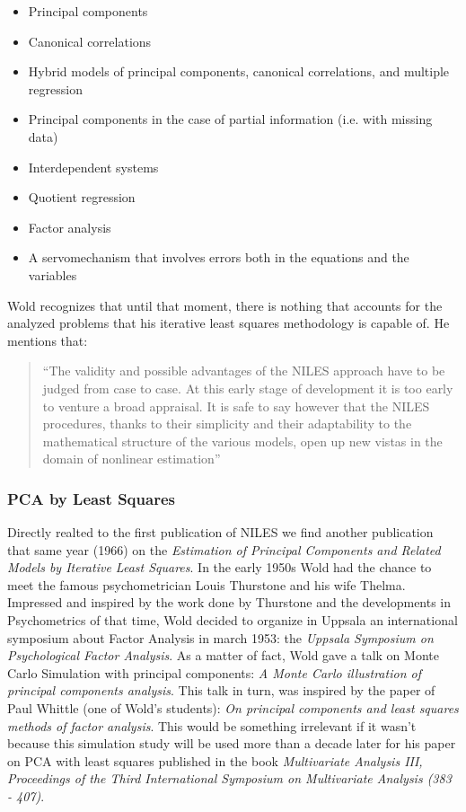 \documentclass[12pt]{book}\usepackage{graphicx, color}
\begin{document}
\begin{itemize}
 \item Principal components 
 \item Canonical correlations
 \item Hybrid models of principal components, canonical correlations, and multiple regression
 \item Principal components in the case of partial information (i.e. with missing data)
 \item Interdependent systems
 \item Quotient regression
 \item Factor analysis
 \item A servomechanism that involves errors both in the equations and the variables
\end{itemize}

\vspace{2mm}
Wold recognizes that until that moment, there is nothing that accounts for the analyzed problems that his iterative least squares methodology is capable of. He mentions that: 

\begin{quotation}\noindent
``The validity and possible advantages of the NILES approach have to be judged from case to case. At this early stage of development it is too early to venture a broad appraisal. It is safe to say however that the NILES procedures, thanks to their simplicity and their adaptability to the mathematical structure of the various models, open up new vistas in the domain of nonlinear estimation''
\end{quotation}


\subsubsection*{PCA by Least Squares}
Directly realted to the first publication of NILES we find another publication that same year (1966) on the \textit{Estimation of Principal Components and Related Models by Iterative Least Squares}. In the early 1950s Wold had the chance to meet the famous psychometrician Louis Thurstone and his wife Thelma. Impressed and inspired by the work done by Thurstone and the developments in Psychometrics of that time, Wold decided to organize in Uppsala an international symposium about Factor Analysis in march 1953: the \textit{Uppsala Symposium on Psychological Factor Analysis}. As a matter of fact, Wold gave a talk on Monte Carlo Simulation with principal components: \textit{A Monte Carlo illustration of principal components analysis}. This talk in turn, was inspired by the paper of Paul Whittle (one of Wold's students): \textit{On principal components and least squares methods of factor analysis}. This would be something irrelevant if it wasn't because this simulation study will be used more than a decade later for his paper on PCA with least squares published in the book \textit{Multivariate Analysis III, Proceedings of the Third International Symposium on Multivariate Analysis (383 - 407)}. 
\end{document}
